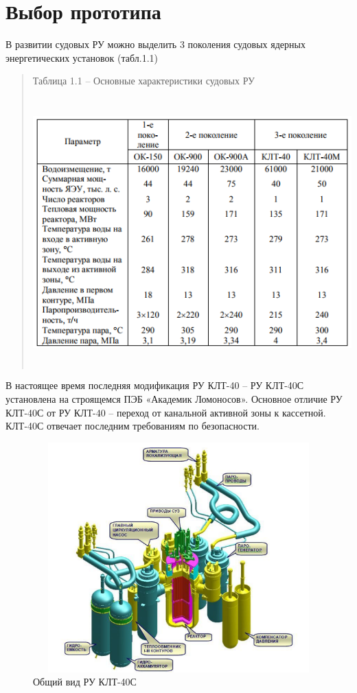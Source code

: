 \section{Выбор прототипа}

В развитии судовых РУ можно выделить 3 поколения судовых ядерных
энергетических установок (табл.1.1)

\begin{quote}
Таблица 1.1 -- Основные характеристики судовых РУ \cite{xlopkin}

\includegraphics[width=5.59903in,height=4.08333in]{media/image2.png}
\end{quote}

В настоящее время последняя модификация РУ КЛТ-40 -- РУ КЛТ-40С
установлена на строящемся ПЭБ «Академик Ломоносов». Основное отличие РУ
КЛТ-40С от РУ КЛТ-40 -- переход от канальной активной зоны к кассетной.
КЛТ-40С отвечает последним требованиям по безопасности.

\begin{figure}[!h]
\center
\includegraphics[width=4.56942in,height=3.48958in]{media/image3.png}
\caption{Общий вид РУ КЛТ-40С}
\end{figure}


